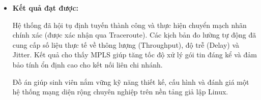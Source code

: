\begin{itemize}
    \item \textbf{Kết quả đạt được:}
    
    Hệ thống đã hội tụ định tuyến thành công và thực hiện chuyển mạch nhãn chính xác (được xác nhận qua Traceroute). Các kịch bản đo lường tự động đã cung cấp số liệu thực tế về thông lượng (Throughput), độ trễ (Delay) và Jitter. Kết quả cho thấy MPLS giúp tăng tốc độ xử lý gói tin đáng kể và đảm bảo tính ổn định cao cho kết nối liên chi nhánh.
    
    Đồ án giúp sinh viên nắm vững kỹ năng thiết kế, cấu hình và đánh giá một hệ thống mạng diện rộng chuyên nghiệp trên nền tảng giả lập Linux.
\end{itemize}

\newpage